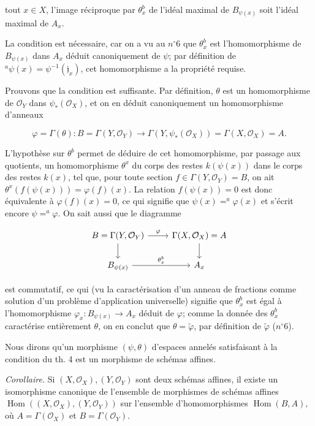 \newpage


tout $x \in X$, l'image réciproque par $\theta_x^b$ de l'idéal maximal de $B_{\psi(x)}$ soit
l'idéal maximal de $A_x$.

La condition est nécessaire, car on a vu au $n^\circ 6$ que $\theta_x^b$ est l'homomorphisme de $B_{\psi(x)}$ dans $A_x$ déduit canoniquement de $\psi$; par définition de $^a\psi(x) = \psi^{-1}(\mathfrak{j}_x)$, cet homomorphisme a la propriété requise.

Prouvons que la condition est suffisante. Par définition, $\theta$ est un homomorphisme de $\mathcal{O}_Y$ dans $\psi_*(\mathcal{O}_X)$, et on en déduit canoniquement un homomorphisme d'anneaux

$$\varphi = \Gamma(\theta) : B = \Gamma(Y, \mathcal{O}_Y) \to \Gamma(Y, \psi_*(\mathcal{O}_X)) = \Gamma(X, \mathcal{O}_X) = A.$$

L'hypothèse sur $\theta^b$ permet de déduire de cet homomorphisme, par passage aux quotients, un homomorphisme $\theta^x$ du corps des restes $k(\psi(x))$ dans le corps des restes $k(x)$, tel que, pour toute section $f \in \Gamma(Y, \mathcal{O}_Y) = B$, on ait $\theta^x(f(\psi(x))) = \varphi(f)(x)$. La relation $f(\psi(x)) = 0$ est donc équivalente à $\varphi(f)(x) = 0$, ce qui signifie que $\psi(x) = ^a\varphi(x)$ et s'écrit encore $\psi = ^a\varphi$. On sait aussi que le diagramme

$$\begin{tikzcd}
B = \Gamma(Y, \mathcal{O}_Y) \arrow[r, "\varphi"] \arrow[d] & \Gamma(X, \mathcal{O}_X) = A \arrow[d] \\
B_{\psi(x)} \arrow[r, "\theta_x^b"] & A_x
\end{tikzcd}$$

est commutatif, ce qui (vu la caractérisation d'un anneau de fractions comme solution d'un problème d'application universelle) signifie que $\theta_x^b$ est égal à l'homomorphisme $\varphi_x : B_{\psi(x)} \to A_x$ déduit de $\varphi$; comme la donnée des $\theta_x^b$ caractérise entièrement $\theta$, on en conclut que $\theta = \tilde{\varphi}$, par définition de $\tilde{\varphi}$ ($n^\circ 6$).

Nous dirons qu'un morphisme $(\psi, \theta)$ d'espaces annelés satisfaisant à la condition du th. 4 est un morphisme de schémas affines.

\emph{Corollaire.} Si $(X, \mathcal{O}_X), (Y, \mathcal{O}_Y)$ sont deux schémas affines, il existe un isomorphisme canonique de l'ensemble de morphismes de schémas affines $\operatorname{Hom}((X, \mathcal{O}_X), (Y, \mathcal{O}_Y))$ sur l'ensemble d'homomorphismes $\operatorname{Hom}(B, A)$, où $A = \Gamma(\mathcal{O}_X)$ et $B = \Gamma(\mathcal{O}_Y)$.

